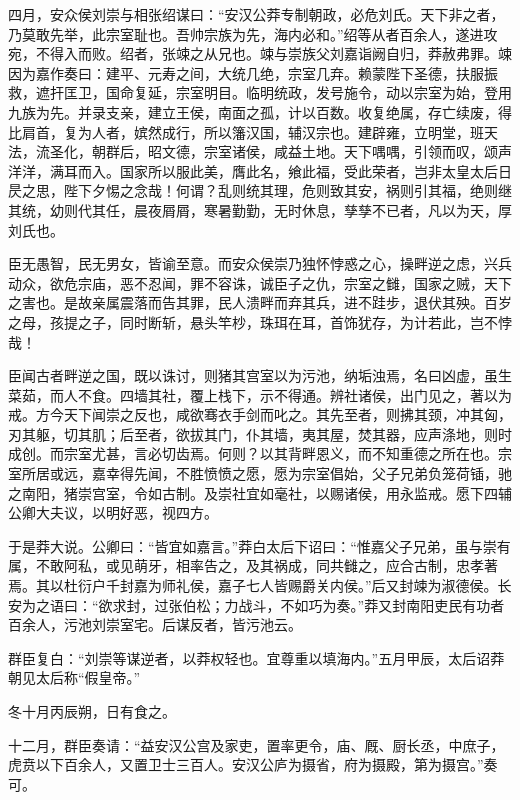 \documentclass[12pt,UTF8]{ctexbook}
\begin{document}
四月，安众侯刘崇与相张绍谋曰：“安汉公莽专制朝政，必危刘氏。天下非之者，乃莫敢先举，此宗室耻也。吾帅宗族为先，海内必和。”绍等从者百余人，遂进攻宛，不得入而败。绍者，张竦之从兄也。竦与崇族父刘嘉诣阙自归，莽赦弗罪。竦因为嘉作奏曰：建平、元寿之间，大统几绝，宗室几弃。赖蒙陛下圣德，扶服振救，遮扞匡卫，国命复延，宗室明目。临明统政，发号施令，动以宗室为始，登用九族为先。并录支亲，建立王侯，南面之孤，计以百数。收复绝属，存亡续废，得比肩首，复为人者，嫔然成行，所以籓汉国，辅汉宗也。建辟雍，立明堂，班天法，流圣化，朝群后，昭文德，宗室诸侯，咸益土地。天下喁喁，引领而叹，颂声洋洋，满耳而入。国家所以服此美，膺此名，飨此福，受此荣者，岂非太皇太后日昃之思，陛下夕惕之念哉！何谓？乱则统其理，危则致其安，祸则引其福，绝则继其统，幼则代其任，晨夜屑屑，寒暑勤勤，无时休息，孳孳不已者，凡以为天，厚刘氏也。



臣无愚智，民无男女，皆谕至意。而安众侯崇乃独怀悖惑之心，操畔逆之虑，兴兵动众，欲危宗庙，恶不忍闻，罪不容诛，诚臣子之仇，宗室之雠，国家之贼，天下之害也。是故亲属震落而告其罪，民人溃畔而弃其兵，进不跬步，退伏其殃。百岁之母，孩提之子，同时断斩，悬头竿杪，珠珥在耳，首饰犹存，为计若此，岂不悖哉！



臣闻古者畔逆之国，既以诛讨，则猪其宫室以为污池，纳垢浊焉，名曰凶虚，虽生菜茹，而人不食。四墙其社，覆上栈下，示不得通。辨社诸侯，出门见之，著以为戒。方今天下闻崇之反也，咸欲骞衣手剑而叱之。其先至者，则拂其颈，冲其匈，刃其躯，切其肌；后至者，欲拔其门，仆其墙，夷其屋，焚其器，应声涤地，则时成创。而宗室尤甚，言必切齿焉。何则？以其背畔恩义，而不知重德之所在也。宗室所居或远，嘉幸得先闻，不胜愤愤之愿，愿为宗室倡始，父子兄弟负笼荷锸，驰之南阳，猪崇宫室，令如古制。及崇社宜如毫社，以赐诸侯，用永监戒。愿下四辅公卿大夫议，以明好恶，视四方。



于是莽大说。公卿曰：“皆宜如嘉言。”莽白太后下诏曰：“惟嘉父子兄弟，虽与崇有属，不敢阿私，或见萌牙，相率告之，及其祸成，同共雠之，应合古制，忠孝著焉。其以杜衍户千封嘉为师礼侯，嘉子七人皆赐爵关内侯。”后又封竦为淑德侯。长安为之语曰：“欲求封，过张伯松；力战斗，不如巧为奏。”莽又封南阳吏民有功者百余人，污池刘崇室宅。后谋反者，皆污池云。



群臣复白：“刘崇等谋逆者，以莽权轻也。宜尊重以填海内。”五月甲辰，太后诏莽朝见太后称“假皇帝。”



冬十月丙辰朔，日有食之。



十二月，群臣奏请：“益安汉公宫及家吏，置率更令，庙、厩、厨长丞，中庶子，虎贲以下百余人，又置卫士三百人。安汉公庐为摄省，府为摄殿，第为摄宫。”奏可。
\end{document}
